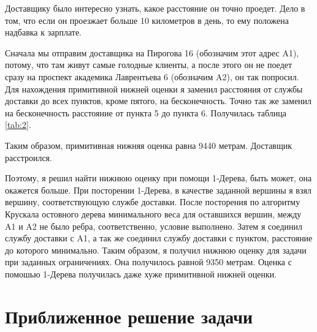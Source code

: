 \documentclass[]{article}
\begin{document}
\par\indent

Доставщику было интересно узнать, какое расстояние он точно проедет. Дело в том,
что если он проезжает больше 10 километров в день, то ему положена надбавка к зарплате.

Сначала мы отправим доставщика на Пирогова 16 (обозначим этот адрес A1), потому, что там живут самые голодные клиенты,
а после этого он не поедет сразу на проспект академика Лаврентьева 6 (обозначим A2), он так попросил.
Для нахождения примитивной нижней оценки я заменил расстояния от службы доставки до
всех пунктов, кроме пятого, на бесконечность. Точно так же заменил на бесконечность расстояние
от пункта 5 до пункта 6. Получилась таблица \ref{tab:2}.
\par
Таким образом, примитивная нижняя оценка равна 9440 метрам. Доставщик расстроился.
\par
Поэтому, я решил найти нижнюю оценку при помощи 1-Дерева, быть может, она
окажется больше. При посторении 1-Дерева, в качестве заданной вершины я взял вершину,
соответствующую службе доставки. После посторения по алгоритму Крускала
остовного дерева минимального веса для оставшихся вершин, между A1 и A2 не
было ребра, соответственно, условие выполнено.
Затем я соединил службу доставки с A1, а так же соединил службу доставки с пунктом,
расстояние до которого минимально. Таким образом, я получил нижнюю оценку для
задачи при заданных ограничениях. Она получилось равной 9350 метрам.
Оценка с помошью 1-Дерева получилась даже хуже примитивной нижней оценки.
\par
\section{Приближенное решение задачи}
\par\indent
\end{document}

